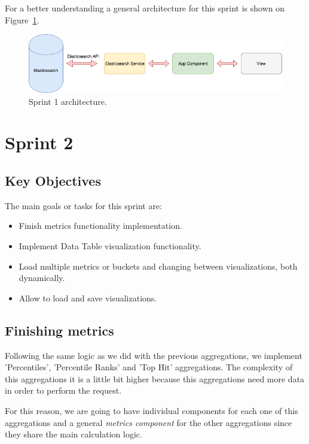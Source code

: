 \documentclass[a4paper, 12pt, english]{book}
\begin{document}
For a better understanding a general architecture for this sprint is shown on Figure~\ref{fig:sprint1-architecture}.
\begin{figure}
  \centering
  \includegraphics[width=13cm, keepaspectratio]{img/sprint1_architecture}
  \caption{Sprint 1 architecture.}
  \label{fig:sprint1-architecture}
\end{figure}


\section{Sprint 2}
\label{sec:sprint-2}
\subsection{Key Objectives}
\label{sec:key-objectives}

The main goals or tasks for this sprint are:
\begin{itemize}
    \item Finish metrics functionality implementation.
    \item Implement Data Table visualization functionality.
    \item Load multiple metrics or buckets and changing between visualizations, both dynamically.
    \item Allow to load and save visualizations.
\end{itemize}

\subsection{Finishing metrics}
\label{sec:finishing-metrics}
Following the same logic as we did with the previous aggregations, we implement 'Percentiles', 'Percentile Ranks' and 'Top Hit' aggregations. The complexity of this aggregations it is a little bit higher because this aggregations need more data in order to perform the request.

For this reason, we are going to have individual components for each one of this aggregations and a general \textit{metrics component} for the other aggregations since they share the main calculation logic.
\end{document}
